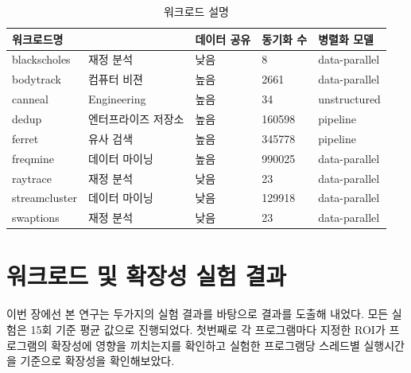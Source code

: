 \documentclass{kcc}
\begin{document}
\begin{table}[h!]
  \caption{워크로드 설명}
  \centering
  \scriptsize 
  \begin{tabular}{l l l l l} \toprule 
    워크로드명 &  & 데이터 공유 & 동기화 수 & 병렬화 모델\\
    \midrule
    blackscholes & 재정 분석 & 낮음 & 8 & data-parallel\\
    \midrule
    bodytrack & 컴퓨터 비젼 & 높음 & 2661 & data-parallel\\
    \midrule
    canneal & Engineering & 높음 & 34 & unstructured\\
    \midrule
    dedup & 엔터프라이즈 저장소 & 높음 & 160598 & pipeline\\
    \midrule
    ferret & 유사 검색 & 높음 & 345778 & pipeline\\
    \midrule
    freqmine & 데이터 마이닝 & 높음 & 990025 & data-parallel\\
    \midrule
    raytrace & 재정 분석 & 낮음 & 23 & data-parallel \\
    \midrule
    streamcluster & 데이터 마이닝 & 낮음 & 129918 & data-parallel\\
    \midrule
    swaptions & 재정 분석 & 낮음 & 23 & data-parallel \\
    \bottomrule
  \end{tabular}
  \label{tab:workload}
\end{table}

\section{워크로드 및 확장성 실험 결과}
 이번 장에선 본 연구는 두가지의 실험 결과를 바탕으로 결과를 도출해 내었다. 모든 실험은 15회 기준 평균 값으로 진행되었다.
첫번째로 각 프로그램마다 지정한 ROI가 프로그램의 확장성에 영향을 끼치는지를 확인하고 실험한 프로그램당 스레드별 실행시간을 기준으로 확장성을 확인해보았다.
\end{document}
